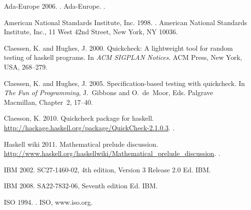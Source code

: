 \documentclass[prodmode,acmtoplas]{acmsmall}
\begin{document}
\begin{thebibliography}{}

Ada-Europe 2006.
.
\newblock Ada-Europe.
.

American National Standards Institute, Inc. 1998.
.
\newblock American National Standards Institute, Inc., 11 West 42nd Street, New
  York, NY 10036.

{\sc Claessen, K.} {\sc and} {\sc Hughes, J.} 2000.
\newblock Quickcheck: A lightweight tool for random testing of haskell
  programs.
\newblock In {\em ACM SIGPLAN Notices}. ACM Press, New York, USA, 268--279.

{\sc Claessen, K.} {\sc and} {\sc Hughes, J.} 2005.
\newblock Specification-based testing with quickcheck.
\newblock In {\em The Fun of Programming}, {J.~Gibbons} {and} {O.~de~Moor},
  Eds. Palgrave Macmillan, Chapter~2, 17--40.

{\sc Claesson, K.} 2010.
\newblock Quickcheck package for haskell.
\newblock \url{http://hackage.haskell.org/package/QuickCheck-2.1.0.3}.
.

Haskell wiki 2011.
\newblock Mathematical prelude discussion.
\newblock
  \url{http://www.haskell.org/haskellwiki/Mathematical_prelude_discussion}.
.

IBM 2002.
  SC27-1460-02, 4th edition, Version 3 Release 2.0 Ed.
\newblock IBM.

IBM 2008.
 SA22-7832-06, Seventh
  edition Ed.
\newblock IBM.

ISO 1994.
.
\newblock ISO, www.iso.org.


\end{thebibliography}
\end{document}
